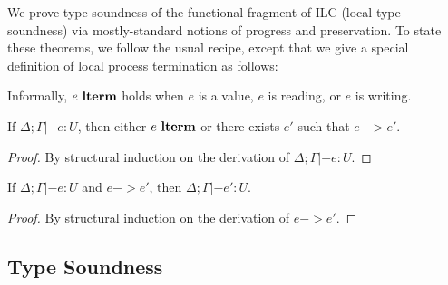 We prove type soundness of the functional fragment of ILC (local type soundness)
via mostly-standard notions of progress and preservation. To state these
theorems, we follow the usual recipe, except that we give a special definition
of local process termination as follows:\smallskip

Informally, $e~\textbf{lterm}$ holds when $e$ is a value, $e$ is reading, or $e$ is writing.

\begin{theorem}
  If $\Delta; \Gamma|- e : U$, then either $e~\textbf{lterm}$
  or there exists $e'$ such that $e -> e'$.
  \begin{proof}
    By structural induction on the derivation of $\Delta ; \Gamma|- e : U$.
  \end{proof}
\end{theorem}

\begin{theorem}
  If $\Delta; \Gamma|- e : U$ and $e -> e'$, then $\Delta; \Gamma|- e' : U$.
  \begin{proof}
    By structural induction on the derivation of $e -> e'$.
  \end{proof}
\end{theorem}

%

\subsection{Type Soundness}

